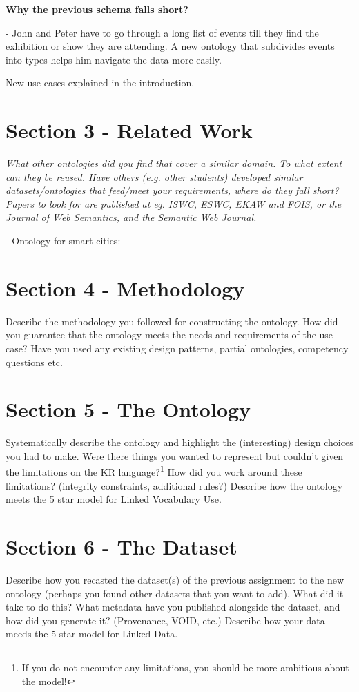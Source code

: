 \documentclass[runningheads,a4paper]{../../StyleFiles/llncs}
\begin{document}
\textbf{Why the previous schema falls short?}

- John and Peter have to go through a long list of events till they find the exhibition or show they are attending. A new ontology that subdivides events into types helps him navigate the data more easily. 

New use cases explained in the introduction. 

\section{Section 3 - Related Work}
\textit{What other ontologies did you find that cover a similar domain. To what extent can they be reused. Have others (e.g. other students) developed similar datasets/ontologies that feed/meet your requirements, where do they fall short? Papers to look for are published at eg. ISWC, ESWC, EKAW and FOIS, or the Journal of Web Semantics, and the Semantic Web Journal.}

 - Ontology for smart cities: \cite{komninos2015smart}


\section{Section 4 - Methodology}
Describe the methodology you followed for constructing the ontology. How did you guarantee that the ontology meets the needs and requirements of the use case? Have you used any existing design patterns, partial ontologies, competency questions etc.

\section{Section 5 - The Ontology}
Systematically describe the ontology and highlight the (interesting) design choices you had to make. Were there things you wanted to represent but couldn't given the limitations on the KR language?\footnote{If you do not encounter any limitations, you should be more ambitious about the model!} How did you work around these limitations? (integrity constraints, additional rules?) Describe how the ontology meets the 5 star model for Linked Vocabulary Use.

\section{Section 6 - The Dataset}
Describe how you recasted the dataset(s) of the previous assignment to the new ontology (perhaps you found other datasets that you want to add). What did it take to do this? What metadata have you published alongside the dataset, and how did you generate it? (Provenance, VOID, etc.) Describe how your data meeds the 5 star model for Linked Data.
\end{document}
